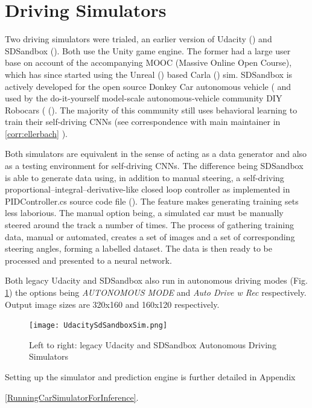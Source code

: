 \section{Driving Simulators}

Two driving simulators were trialed, an earlier version of Udacity (\cite{UdacityCarSim}) and SDSandbox (\cite{SDSandboxSim}). Both use the Unity game engine. The former had a large user base on account of the accompanying MOOC (Massive Online Open Course), which has since started using the Unreal (\cite{unrealengine}) based Carla (\cite{Dosovitskiy17}) sim. SDSandbox is actively developed for the open source Donkey Car autonomous vehicle (\cite{DonkeyCar2020} and used by the do-it-yourself model-scale autonomous-vehicle community DIY Robocars (\cite{DIYRobocars2020} (\cite{DIYRobocars2020}). The majority of this community still uses behavioral learning to train their self-driving CNNs (see correspondence with main maintainer in \ref{corr:ellerbach}
).  
 
Both simulators are equivalent in the sense of acting as a data generator and also as a testing environment for self-driving CNNs. The difference being SDSandbox is able to generate data using, in addition to manual steering, a self-driving proportional–integral–derivative-like closed loop controller as implemented in PIDController.cs source code file (\cite{SDSandboxSim}). The feature makes generating training sets less laborious. The manual option being, a simulated car must be manually steered around the track a number of times. The process of gathering training data, manual or automated, creates a set of images and a set of corresponding steering angles, forming a labelled dataset.
The data is then ready to be processed and presented to a neural network.

Both legacy Udacity and SDSandbox also run in autonomous driving modes (Fig. \ref{fig:UdacitySdSandboxAutonomous}) the options being \textit{AUTONOMOUS MODE} and \textit{Auto Drive w Rec} respectively. Output image sizes are 320x160 and 160x120 respectively.


\begin{figure}[h!]
\centering
\texttt{[image: UdacitySdSandboxSim.png]}
\caption{Left to right: legacy Udacity and SDSandbox Autonomous Driving Simulators}
\label{fig:UdacitySdSandboxAutonomous}
\end{figure}

Setting up the simulator and prediction engine is further detailed in Appendix

\ref{RunningCarSimulatorForInference}.

